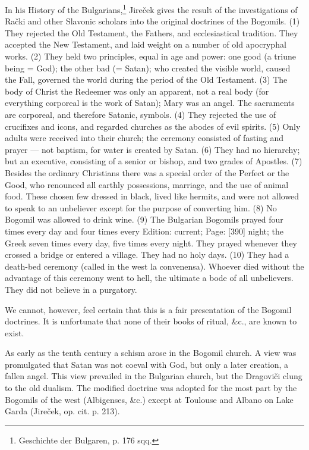 In his History of the Bulgarians,\footnote{Geschichte der Bulgaren, p. 176 sqq.} Jireček gives the result of the investigations of Rački and other Slavonic scholars into the original doctrines of the Bogomils. (1) They rejected the Old Testament, the Fathers, and ecclesiastical tradition. They accepted the New Testament, and laid weight on a number of old apocryphal works. (2) They held two principles, equal in age and power: one good (a triune being = God); the other bad (= Satan); who created the visible world, caused the Fall, governed the world during the period of the Old Testament. (3) The body of Christ the Redeemer was only an apparent, not a real body (for everything corporeal is the work of Satan); Mary was an angel. The sacraments are corporeal, and therefore Satanic, symbols. (4) They rejected the use of crucifixes and icons, and regarded churches as the abodes of evil spirits. (5) Only adults were received into their church; the ceremony consisted of fasting and prayer \texthebrew{—} not baptism, for water is created by Satan. (6) They had no hierarchy; but an executive, consisting of a senior or bishop, and two grades of Apostles. (7) Besides the ordinary Christians there was a special order of the Perfect or the Good, who renounced all earthly possessions, marriage, and the use of animal food. These chosen few dressed in black, lived like hermits, and were not allowed to speak to an unbeliever except for the purpose of converting him. (8) No Bogomil was allowed to drink wine. (9) The Bulgarian Bogomils prayed four times every day and four times every Edition: current; Page: [390] night; the Greek seven times every day, five times every night. They prayed whenever they crossed a bridge or entered a village. They had no holy days. (10) They had a death-bed ceremony (called in the west la convenensa). Whoever died without the advantage of this ceremony went to hell, the ultimate a bode of all unbelievers. They did not believe in a purgatory.

We cannot, however, feel certain that this is a fair presentation of the Bogomil doctrines. It is unfortunate that none of their books of ritual, \&c., are known to exist.

As early as the tenth century a schism arose in the Bogomil church. A view was promulgated that Satan was not coeval with God, but only a later creation, a fallen angel. This view prevailed in the Bulgarian church, but the Dragoviči clung to the old dualism. The modified doctrine was adopted for the most part by the Bogomils of the west (Albigenses, \&c.) except at Toulouse and Albano on Lake Garda (Jireček, op. cit. p. 213).


